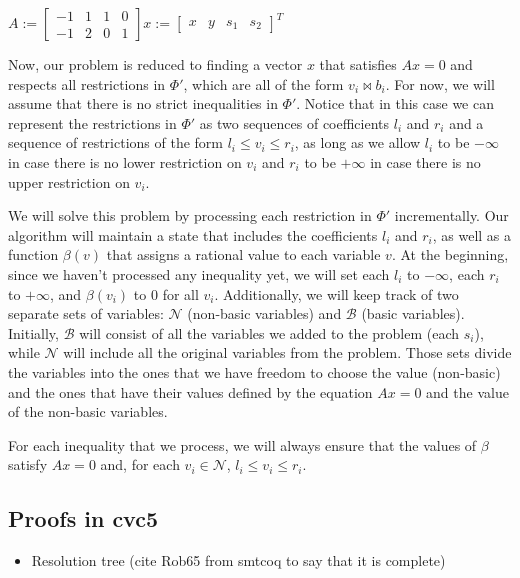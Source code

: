 \begin{center}
$
A :=
\begin{bmatrix}
  -1 & 1 & 1 & 0 \\
  -1 & 2 & 0 & 1
\end{bmatrix}
x :=
\begin{bmatrix}
  x & y & s_{1} & s_{2}
\end{bmatrix}^{T}
$
\end{center}

Now, our problem is reduced to finding a vector $x$ that satisfies $Ax = 0$ and respects all restrictions in $\Phi'$, which are all of the form $v_{i} \bowtie b_{i}$. For now, we will assume that there is no strict inequalities in $\Phi'$. Notice that in this case we can represent the restrictions in $\Phi'$ as two sequences of coefficients $l_{i}$ and $r_{i}$ and a sequence of restrictions of the form $l_{i} \le v_{i} \le r_{i}$, as long as we allow $l_{i}$ to be $-\infty$ in case there is no lower restriction on $v_{i}$ and $r_{i}$ to be $+\infty$ in case there is no upper restriction on $v_{i}$.

We will solve this problem by processing each restriction in $\Phi'$ incrementally. Our algorithm will maintain a state that includes the coefficients $l_{i}$ and $r_{i}$, as well as a function $\beta(v)$ that assigns a rational value to each variable $v$. At the beginning, since we haven't processed any inequality yet, we will set each $l_{i}$ to $-\infty$, each $r_{i}$ to $+\infty$, and $\beta(v_{i})$ to $0$ for all $v_{i}$. Additionally, we will keep track of two separate sets of variables: $\mathcal{N}$ (non-basic variables) and $\mathcal{B}$ (basic variables). Initially, $\mathcal{B}$ will consist of all the variables we added to the problem (each $s_{i}$), while $\mathcal{N}$ will include all the original variables from the problem. Those sets divide the variables into the ones that we have freedom to choose the value (non-basic) and the ones that have their values defined by the equation $Ax = 0$ and the value of the non-basic variables.

For each inequality that we process, we will always ensure that the values of $\beta$ satisfy $Ax = 0$ and, for each $v_{i} \in \mathcal{N}$, $l_{i} \le v_{i} \le r_{i}$.


\subsection{Proofs in cvc5}

\begin{itemize}
  \item Resolution tree (cite Rob65 from smtcoq to say that it is complete)
\end{itemize}

